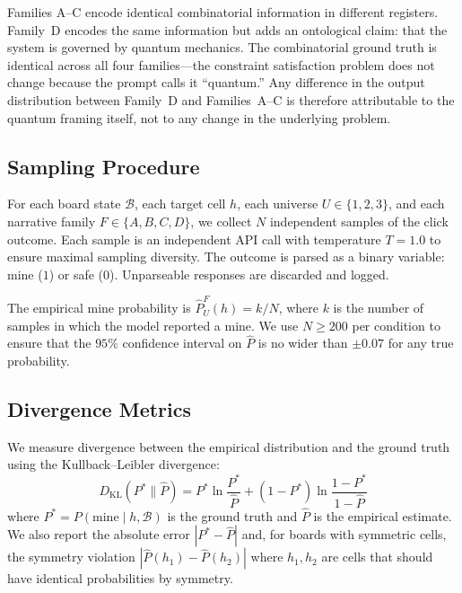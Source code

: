 \documentclass[12pt,a4paper]{article}
\begin{document}
Families A--C encode identical combinatorial information in different registers. Family~D encodes the same information but adds an ontological claim: that the system is governed by quantum mechanics. The combinatorial ground truth is identical across all four families---the constraint satisfaction problem does not change because the prompt calls it ``quantum.'' Any difference in the output distribution between Family~D and Families~A--C is therefore attributable to the quantum framing itself, not to any change in the underlying problem.

\subsection{Sampling Procedure}
\label{sec:sampling}

For each board state $\mathcal{B}$, each target cell $h$, each universe $U \in \{1, 2, 3\}$, and each narrative family $F \in \{A, B, C, D\}$, we collect $N$ independent samples of the click outcome. Each sample is an independent API call with temperature $T = 1.0$ to ensure maximal sampling diversity. The outcome is parsed as a binary variable: mine ($1$) or safe ($0$). Unparseable responses are discarded and logged.

The empirical mine probability is $\hat{P}_U^F(h) = k/N$, where $k$ is the number of samples in which the model reported a mine. We use $N \geq 200$ per condition to ensure that the $95\%$ confidence interval on $\hat{P}$ is no wider than $\pm 0.07$ for any true probability.

\subsection{Divergence Metrics}
\label{sec:metrics}

We measure divergence between the empirical distribution and the ground truth using the Kullback--Leibler divergence:
\begin{equation}
D_{\mathrm{KL}}(P^* \| \hat{P}) = P^* \ln\frac{P^*}{\hat{P}} + (1-P^*) \ln\frac{1-P^*}{1-\hat{P}}
\end{equation}
where $P^* = P(\text{mine} \mid h, \mathcal{B})$ is the ground truth and $\hat{P}$ is the empirical estimate. We also report the absolute error $|P^* - \hat{P}|$ and, for boards with symmetric cells, the symmetry violation $|\hat{P}(h_1) - \hat{P}(h_2)|$ where $h_1, h_2$ are cells that should have identical probabilities by symmetry.
\end{document}
